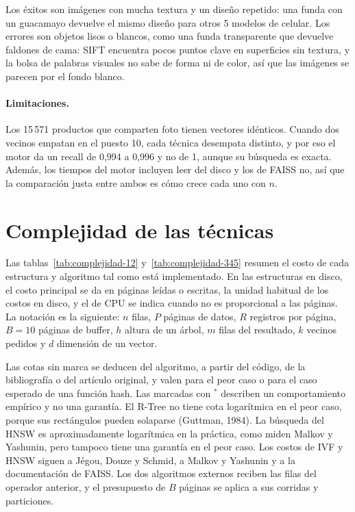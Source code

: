 \documentclass[11pt,a4paper]{article}
\begin{document}
Los éxitos son imágenes con mucha textura y un diseño repetido: una funda con un guacamayo devuelve el mismo diseño para otros 5 modelos de celular. Los errores son objetos lisos o blancos, como una funda transparente que devuelve faldones de cama: SIFT encuentra pocos puntos clave en superficies sin textura, y la bolsa de palabras visuales no sabe de forma ni de color, así que las imágenes se parecen por el fondo blanco.

\paragraph{Limitaciones.} Los 15\,571 productos que comparten foto tienen vectores idénticos. Cuando dos vecinos empatan en el puesto 10, cada técnica desempata distinto, y por eso el motor da un recall de 0,994 a 0,996 y no de 1, aunque su búsqueda es exacta. Además, los tiempos del motor incluyen leer del disco y los de FAISS no, así que la comparación justa entre ambos es cómo crece cada uno con $n$.

\section{Complejidad de las técnicas}
\label{sec:complejidad}

Las tablas~\ref{tab:complejidad-12} y~\ref{tab:complejidad-345} resumen el costo de cada estructura y algoritmo tal como está implementado. En las estructuras en disco, el costo principal se da en páginas leídas o escritas, la unidad habitual de los costos en disco, y el de CPU se indica cuando no es proporcional a las páginas. La notación es la siguiente: $n$ filas, $P$ páginas de datos, $R$ registros por página, $B = 10$ páginas de buffer, $h$ altura de un árbol, $m$ filas del resultado, $k$ vecinos pedidos y $d$ dimensión de un vector.

Las cotas sin marca se deducen del algoritmo, a partir del código, de la bibliografía o del artículo original, y valen para el peor caso o para el caso esperado de una función hash. Las marcadas con $^\ast$ describen un comportamiento empírico y no una garantía. El R-Tree no tiene cota logarítmica en el peor caso, porque sus rectángulos pueden solaparse (Guttman, 1984). La búsqueda del HNSW es aproximadamente logarítmica en la práctica, como miden Malkov y Yashunin, pero tampoco tiene una garantía en el peor caso. Los costos de IVF y HNSW siguen a Jégou, Douze y Schmid, a Malkov y Yashunin y a la documentación de FAISS. Los dos algoritmos externos reciben las filas del operador anterior, y el presupuesto de $B$ páginas se aplica a sus corridas y particiones.
\end{document}
